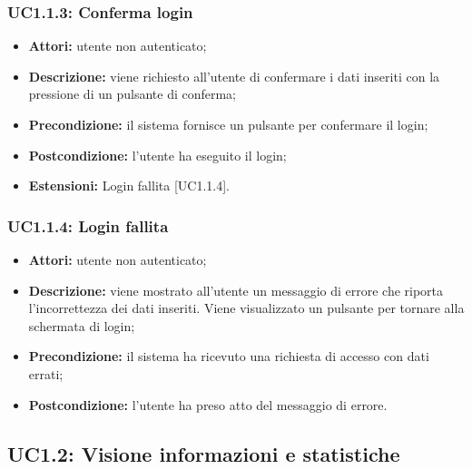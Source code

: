 \subsubsection{UC1.1.3: Conferma login}

\begin{itemize}
    \item \textbf{Attori:} utente non autenticato;
    \item \textbf{Descrizione:} viene richiesto all'utente di confermare i dati inseriti con la pressione di un pulsante di conferma;
    \item \textbf{Precondizione:} il sistema fornisce un pulsante per confermare il login;
    \item \textbf{Postcondizione:} l'utente ha eseguito il login;
    \item \textbf{Estensioni:} Login fallita [UC1.1.4].
\end{itemize}

\subsubsection{UC1.1.4: Login fallita}

\begin{itemize}
    \item \textbf{Attori:} utente non autenticato;
    \item \textbf{Descrizione:} viene mostrato all'utente un messaggio di errore che riporta l'incorrettezza dei dati inseriti. Viene visualizzato un pulsante per tornare alla schermata di login;
    \item \textbf{Precondizione:} il sistema ha ricevuto una richiesta di accesso con dati errati;
    \item \textbf{Postcondizione:} l'utente ha preso atto del messaggio di errore.
\end{itemize}

\pagebreak

\subsection{UC1.2: Visione informazioni e statistiche}

